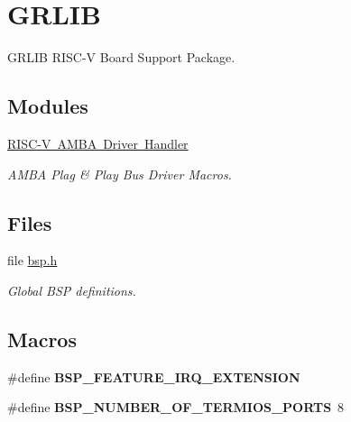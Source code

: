 \hypertarget{group__RTEMSBSPsRISCVGRLIB}{}\section{G\+R\+L\+IB}
\label{group__RTEMSBSPsRISCVGRLIB}


G\+R\+L\+IB R\+I\+S\+C-\/V Board Support Package.  


\subsection*{Modules}
\begin{DoxyCompactItemize}
\item 
\mbox{\hyperlink{group__RTEMSBSPsRISCVGRLIBAMBA}{R\+I\+S\+C-\/\+V A\+M\+B\+A Driver Handler}}
\begin{DoxyCompactList}\small\item\em A\+M\+BA Plag \& Play Bus Driver Macros. \end{DoxyCompactList}\end{DoxyCompactItemize}
\subsection*{Files}
\begin{DoxyCompactItemize}
\item 
file \mbox{\hyperlink{bsps_2riscv_2griscv_2include_2bsp_8h}{bsp.\+h}}
\begin{DoxyCompactList}\small\item\em Global B\+SP definitions. \end{DoxyCompactList}\end{DoxyCompactItemize}
\subsection*{Macros}
\begin{DoxyCompactItemize}
\item 
\mbox{\label{group__RTEMSBSPsRISCVGRLIB_ga5d7d631d3a14b7554160f14eb42f351b}} 
\#define {\bfseries B\+S\+P\+\_\+\+F\+E\+A\+T\+U\+R\+E\+\_\+\+I\+R\+Q\+\_\+\+E\+X\+T\+E\+N\+S\+I\+ON}
\item 
\mbox{\label{group__RTEMSBSPsRISCVGRLIB_gacc66c026256a179dbe566201017a971b}} 
\#define {\bfseries B\+S\+P\+\_\+\+N\+U\+M\+B\+E\+R\+\_\+\+O\+F\+\_\+\+T\+E\+R\+M\+I\+O\+S\+\_\+\+P\+O\+R\+TS}~8
\end{DoxyCompactItemize}
